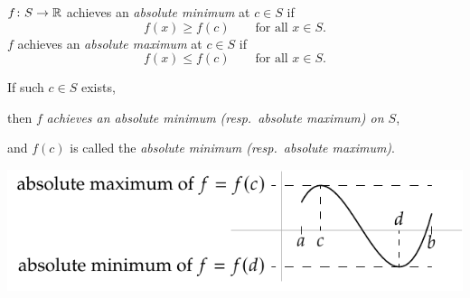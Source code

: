 \documentclass[10pt,aspectratio=149]{beamer}
\begin{document}
\begin{frame}
$f \colon S \to {\mathbb{R}}$ achieves an
\emph{absolute minimum} at $c \in S$ if
\begin{equation*}
f(x) \geq f(c) \qquad \text{for all } x \in S.
\end{equation*}
\pause
$f$ achieves an 
\emph{absolute maximum} at $c \in S$ if
\begin{equation*}
f(x) \leq f(c) \qquad \text{for all } x \in S.
\end{equation*}

\pause
If such $c \in S$ exists,

then 
$f$ \emph{achieves an absolute minimum (resp.\ absolute maximum) on
$S$},

and $f(c)$ is called the \emph{absolute minimum (resp.\ absolute maximum)}.

\pause
\medskip

\begin{center}
\includegraphics{../figures/minmax}
\end{center}
\end{frame}
\end{document}
